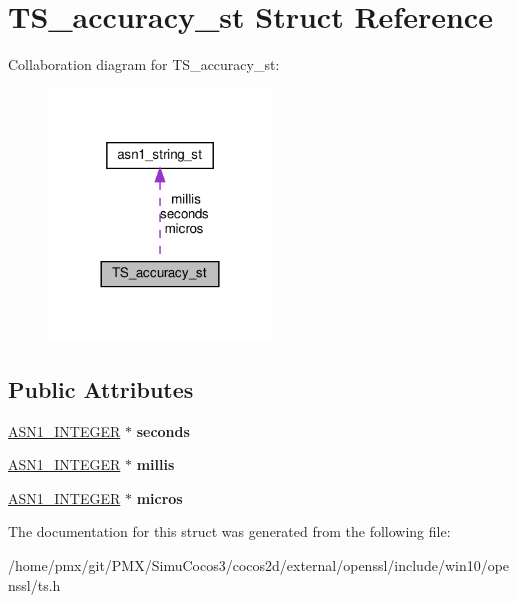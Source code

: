 \hypertarget{structTS__accuracy__st}{}\section{T\+S\+\_\+accuracy\+\_\+st Struct Reference}
\label{structTS__accuracy__st}


Collaboration diagram for T\+S\+\_\+accuracy\+\_\+st\+:
\nopagebreak
\begin{figure}[H]
\begin{center}
\leavevmode
\includegraphics[width=168pt]{structTS__accuracy__st__coll__graph}
\end{center}
\end{figure}
\subsection*{Public Attributes}
\begin{DoxyCompactItemize}
\item 
\mbox{\label{structTS__accuracy__st_a50d21da03ece4bf6c78f3fa96ffaae15}} 
\hyperlink{structasn1__string__st}{A\+S\+N1\+\_\+\+I\+N\+T\+E\+G\+ER} $\ast$ {\bfseries seconds}
\item 
\mbox{\label{structTS__accuracy__st_a617d05085e9ab508437929ab86b6f4a3}} 
\hyperlink{structasn1__string__st}{A\+S\+N1\+\_\+\+I\+N\+T\+E\+G\+ER} $\ast$ {\bfseries millis}
\item 
\mbox{\label{structTS__accuracy__st_af1acda98f117fef39f799581bf37bb38}} 
\hyperlink{structasn1__string__st}{A\+S\+N1\+\_\+\+I\+N\+T\+E\+G\+ER} $\ast$ {\bfseries micros}
\end{DoxyCompactItemize}


The documentation for this struct was generated from the following file\+:\begin{DoxyCompactItemize}
\item 
/home/pmx/git/\+P\+M\+X/\+Simu\+Cocos3/cocos2d/external/openssl/include/win10/openssl/ts.\+h\end{DoxyCompactItemize}
